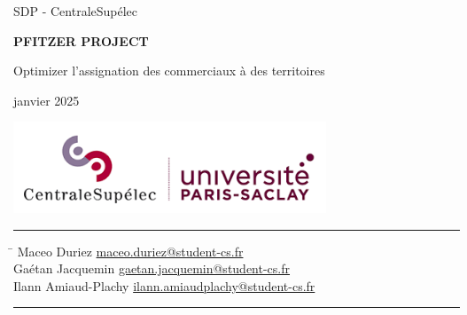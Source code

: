 


\begin{titlepage}
    \begin{center}
        \vspace*{1cm}

        \LARGE
        SDP - CentraleSupélec
        
        \vspace{1.5cm}
        
        \LARGE
        \textbf{PFITZER PROJECT}
        
        \vspace{0.5cm}
        
        \Large
        Optimizer l'assignation des commerciaux à des territoires
        
        \vspace{0.5cm}
        
        \large
        janvier 2025
        
        \vspace{1.5cm}
        
        \includegraphics[width=0.7\textwidth]{logos/centraleSupelec.png}
        
        \vfill
        
        \hrule
        
        \vspace{0.5cm}
        
        \large
        \begin{tabbing}
            \hspace{7cm} \= \hspace{8cm} \kill
            Maceo Duriez \> \href{mailto:maceo.duriez@student-cs.fr}{maceo.duriez@student-cs.fr} \\
            Gaétan Jacquemin \> \href{mailto:gaetan.jacquemin@student-cs.fr}{gaetan.jacquemin@student-cs.fr} \\
            Ilann Amiaud-Plachy \> \href{mailto:ilann.amiaudplachy@student-cs.fr}{ilann.amiaudplachy@student-cs.fr}
        \end{tabbing}
        
        \vspace{0.5cm}
        
        \hrule
        
    \end{center}
\end{titlepage}


